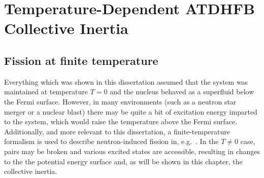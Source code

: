 \chapter{Temperature-Dependent ATDHFB Collective Inertia}\label{append:TD-ATDHFB}




\section{Fission at finite temperature}

Everything which was shown in this dissertation assumed that the system was maintained at temperature $T=0$ and the nucleus behaved as a superfluid below the Fermi surface. However, in many environments (such as a neutron star merger or a nuclear blast) there may be quite a bit of excitation energy imparted to the system, which would raise the temperature above the Fermi surface. Additionally, and more relevant to this dissertation, a finite-temperature formalism is used to describe neutron-induced fission in, e.g.~\cite{Mcdonnell2014}. In the $T\neq0$ case, pairs may be broken and various excited states are accessible, resulting in changes to the the potential energy surface and, as will be shown in this chapter, the collective inertia.

